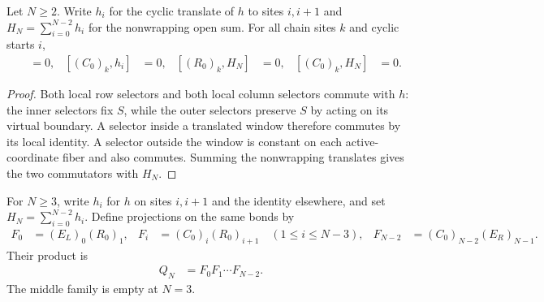 \begin{theorem}
    \label{thm:mpo_joint_open_phase_commutators}
    Let $N\ge2$. Write $h_i$ for the cyclic translate of $h$ to sites
    $i,i+1$ and $H_N=\sum_{i=0}^{N-2}h_i$ for the nonwrapping open sum.
    For all chain sites $k$ and cyclic starts $i$,
    \begin{align}
        [(R_0)_k,h_i] & =0, & [(C_0)_k,h_i] & =0, &
        [(R_0)_k,H_N] & =0, & [(C_0)_k,H_N] & =0.
    \end{align}
\end{theorem}
\begin{proof}
    Both local row selectors and both local column selectors commute
    with $h$: the inner selectors fix $S$, while the outer selectors
    preserve $S$ by acting on its virtual boundary. A selector inside
    a translated window therefore commutes by its local identity.
    A selector outside the window is constant on each active-coordinate
    fiber and also commutes. Summing the nonwrapping translates gives
    the two commutators with $H_N$.
\end{proof}

\begin{definition}
    \label{def:mpo_joint_open_active_projection}
    For $N\ge3$, write $h_i$ for $h$ on sites $i,i+1$ and the
    identity elsewhere, and set $H_N=\sum_{i=0}^{N-2}h_i$.
    Define projections on the same bonds by
    \begin{align}
        F_0     & =(E_L)_0(R_0)_1,                         &
        F_i     & =(C_0)_i(R_0)_{i+1}\quad(1\le i\le N-3), &
        F_{N-2} & =(C_0)_{N-2}(E_R)_{N-1}.
        \label{eq:mpo_joint_open_bond_constraints}
    \end{align}
    Their product is
    \begin{align}
        Q_N & =F_0F_1\cdots F_{N-2}.
        \label{eq:mpo_joint_open_active_product}
    \end{align}
    The middle family is empty at $N=3$.
\end{definition}

